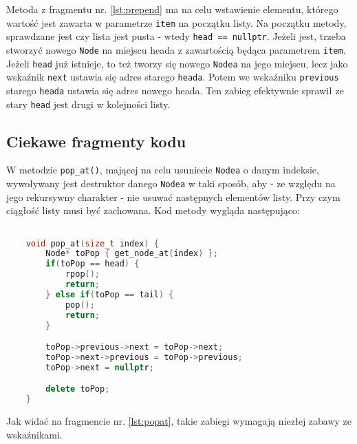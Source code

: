 Metoda z fragmentu nr. \ref{lst:prepend} ma na celu wstawienie elementu, którego wartość jest zawarta w parametrze \texttt{item} na początku listy. Na początku metody, sprawdzane jest czy lista jest pusta - wtedy \texttt{head == nullptr}. Jeżeli jest, trzeba stworzyć nowego \texttt{Node} na miejscu heada z zawartością będąca parametrem \texttt{item}. Jeżeli \texttt{head} już istnieje, to też tworzy się nowego \texttt{Nodea} na jego miejscu, lecz jako wskaźnik \texttt{next} ustawia się adres starego \texttt{heada}. Potem we wskaźniku \texttt{previous} starego \texttt{heada} ustawia się adres nowego heada. Ten zabieg efektywnie sprawił ze stary \texttt{head} jest drugi w kolejności listy.

\subsection{Ciekawe fragmenty kodu}

W metodzie \texttt{pop\_at()}, mającej na celu usuniecie \texttt{Nodea} o danym indeksie, wywoływany jest destruktor danego \texttt{Nodea} w taki sposób, aby - ze względu na jego rekursywny charakter - nie usuwać następnych elementów listy. Przy czym ciągłość listy musi być zachowana. Kod metody wygląda następująco:

\begin{lstlisting}[caption=Kod \texttt{pop\_at()}, label={lst:popat}, language=C++]

	void pop_at(size_t index) {
		Node* toPop { get_node_at(index) };
		if(toPop == head) {
			rpop();
			return;
		} else if(toPop == tail) {
			pop();
			return;
		}

		toPop->previous->next = toPop->next;
		toPop->next->previous = toPop->previous;
		toPop->next = nullptr;

		delete toPop;
	}

\end{lstlisting}

Jak widać na fragmencie nr. \ref{lst:popat}, takie zabiegi wymagają niezłej zabawy ze wskaźnikami. 
